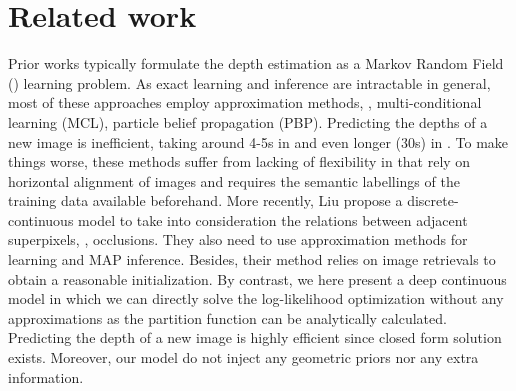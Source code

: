 \section{Related work}
Prior works \cite{Saxena_nips05,make3d_pami09,Liu_cvpr12} 
%
typically formulate the depth estimation as a Markov Random Field (\mrf) learning problem.
As exact \mrf learning and inference are intractable in general, 
%
%
most of these approaches employ approximation methods, \eg, multi-conditional learning (MCL), particle belief propagation (PBP). 
Predicting the depths of a new image is inefficient, taking around 4-5s in \cite{make3d_pami09} and even longer (30s) in \cite{Liu_cvpr12}.
To make things worse, these methods suffer from lacking of flexibility in that \cite{Saxena_nips05,make3d_pami09}  rely on horizontal alignment of images and %
\cite{Liu_cvpr12} requires the semantic labellings of the training data available beforehand. 
%
More recently, Liu \etal \cite{Miaomiao_cvpr14} propose a discrete-continuous \crf model to take into consideration the relations between adjacent superpixels, \eg, occlusions. They also need to use approximation methods for learning and MAP inference.
Besides, their method relies on image retrievals to obtain a reasonable initialization.  
By contrast, we here present a deep continuous \crf model in which we can directly solve the log-likelihood optimization without any approximations as the partition function can be analytically calculated.
Predicting the depth of a new image is highly efficient since closed form solution exists.
Moreover, our model do not inject any geometric priors nor any extra information.
%
 
